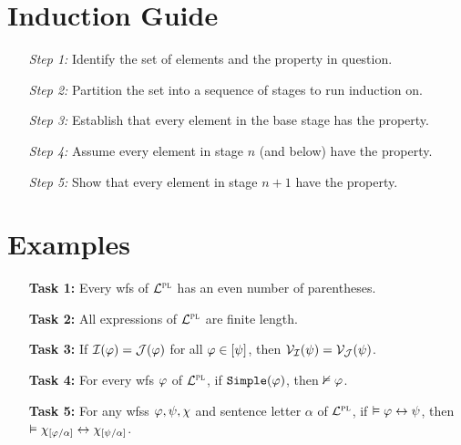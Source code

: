 \documentclass[a4paper, 11pt]{article} %
\begin{document}
\section*{Induction Guide}

\begin{enumerate}
  \item[\it Step 1:] Identify the set of elements and the property in question.
  \item[\it Step 2:] Partition the set into a sequence of stages to run induction on.
  \item[\it Step 3:] Establish that every element in the base stage has the property.
  \item[\it Step 4:] Assume every element in stage $n$ (and below) have the property. 
  \item[\it Step 5:] Show that every element in stage $n+1$ have the property. 
\end{enumerate}





\section*{Examples}

\begin{enumerate}
  \item[\bf Task 1:] Every wfs of $\mathcal{L}^{\textsc{pl}}$ has an even number of parentheses. 
  \item[\bf Task 2:] All expressions of $\mathcal{L}^{\textsc{pl}}$ are finite length.
  \item[\bf Task 3:] If $\mathcal{I}(\varphi) = \mathcal{J}(\varphi)$ for all $\varphi \in [\psi]$, then $\mathcal{V}_{\mathcal{I}}(\psi) = \mathcal{V}_{\mathcal{J}}(\psi)$. 
  \item[\bf Task 4:] For every wfs $\varphi$ of $\mathcal{L}^{\textsc{pl}}$, if $\texttt{Simple}(\varphi)$, then $\nvDash\varphi$. %
  \item[\bf Task 5:] For any wfss $\varphi,\psi,\chi$ and sentence letter $\alpha$ of $\mathcal{L}^{\textsc{pl}}$, if $\vDash \varphi \leftrightarrow \psi$, then $\vDash \chi_{[\varphi/\alpha]}\leftrightarrow\chi_{[\psi/\alpha]}$.
\end{enumerate}
\end{document}
